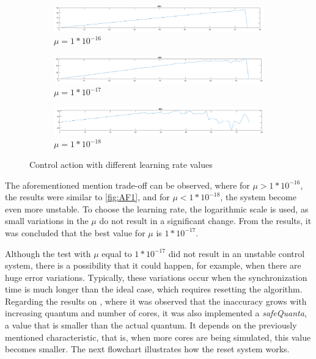 \begin{figure}
\centering
\begin{subfigure}{\textwidth}
    \includegraphics[width=\textwidth]{Images/AF1.png}
    \caption{ $\mu = 1 * 10^{-16} $ }
    \label{fig:AF1}
\end{subfigure}
\begin{subfigure}{\textwidth}
    \includegraphics[width=\textwidth]{Images/AF2.png}
    \caption{ $\mu = 1 * 10^{-17}$ }
    \label{fig:AF2}
\end{subfigure}
\begin{subfigure}{\textwidth}
    \includegraphics[width=\textwidth]{Images/AF3.png}
    \caption{ $\mu = 1 * 10^{-18}$ }
    \label{fig:AF3}
\end{subfigure}
        
\caption{Control action with different learning rate values}
\label{fig:learningRateTests}
\end{figure}

 The aforementioned mention trade-off can be observed, where for $\mu > 1 * 10^{-16} $, the results were similar to \autoref{fig:AF1}, and 
 for $\mu < 1 * 10^{-18} $, the system become even more unstable. To choose the learning rate, the logarithmic scale is used, as small variations 
 in the $\mu$ do not result in a significant change. From the results, it was concluded that the best value for $\mu$ is $1 * 10^{-17}$. 

Although the test with $\mu$ equal to $1 * 10^{-17}$ did not result in an unstable control system, there is a possibility that it could 
happen, for example, when there are huge error variations. Typically, these variations occur when the synchronization time is much longer than the 
ideal case, which requires resetting the algorithm. Regarding the results on \cite{pargem5}, where it was observed that the inaccuracy grows with 
increasing quantum and number of cores, it was also implemented a \textit{safeQuanta}, a value that is smaller than the actual quantum. It depends 
on the previously mentioned characteristic, that is, when more cores are being simulated, this value becomes smaller. 
The next flowchart illustrates how the reset system works.

